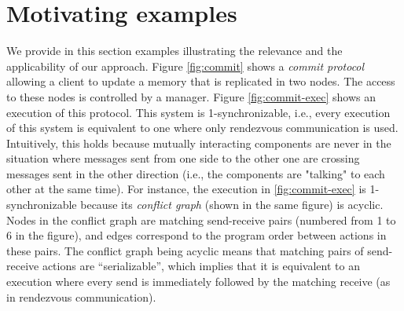\section{Motivating examples}
\label{sec:motivation}

%
%
%
%
%
%

We provide in this section examples illustrating the relevance and the applicability of our approach. %
Figure \ref{fig:commit} shows a {\em commit protocol} allowing a client to update a memory that is replicated in two nodes. The access to these nodes is controlled by a manager. Figure \ref{fig:commit-exec} shows an execution of this protocol. This system is 1-synchronizable, i.e., every execution of this system is equivalent to one where only rendezvous communication is used. Intuitively, this holds because mutually interacting components are never in the situation where messages sent from one side to the other one are crossing messages sent in the other direction (i.e., the components are "talking" to each other at the same time). For instance, the execution in \ref{fig:commit-exec} is 1-synchronizable because its \emph{conflict graph} (shown in the same figure) is acyclic. Nodes in the conflict graph are matching send-receive pairs (numbered from 1 to 6 in the figure), and edges correspond to the program order between actions in these pairs. The conflict graph being acyclic means that matching pairs of send-receive actions are ``serializable'', which implies that it is equivalent to an execution where every send is immediately followed by the matching receive (as in rendezvous communication).

